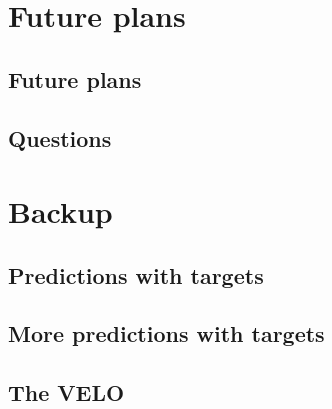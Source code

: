 \documentclass[aspectratio=169, 10pt]{beamer}
\begin{document}
\section{Future plans}

\subsection{Future plans}


\subsection{Questions}



\backupbegin
\section{Backup}

\subsection{Predictions with targets}


\subsection{More predictions with targets}


\subsection{The VELO}


\backupend
\end{document}
